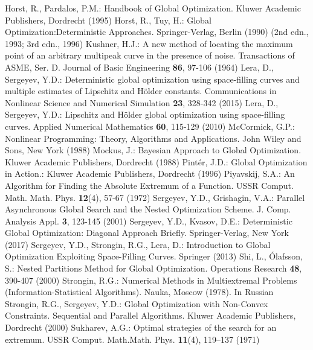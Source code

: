 \begin{thebibliography}{99.}
	Horst, R., Pardalos, P.M.: Handbook of Global Optimization. Kluwer Academic Publishers, Dordrecht (1995)
	Horst, R., Tuy, H.: Global Optimization:Deterministic Approaches. Springer-Verlag, Berlin (1990) (2nd edn., 1993; 3rd edn., 1996)
	Kushner, H.J.: A new method of locating the maximum point of an arbitrary multipeak curve in the presence of noise. Transactions of ASME, Ser. D. Journal of Basic Engineering \textbf{86}, 97-106 (1964)
	Lera, D., Sergeyev, Y.D.: Deterministic global optimization using space-filling curves and multiple estimates of Lipschitz and H{\"o}lder constants. Communications in Nonlinear Science and Numerical Simulation \textbf{23}, 328-342 (2015)
	Lera, D., Sergeyev, Y.D.: Lipschitz and H{\"o}lder global optimization using space-filling curves. Applied Numerical Mathematics \textbf{60}, 115-129 (2010) 
	McCormick, G.P.: Nonlinear Programming: Theory, Algorithms and Applications. John Wiley and Sons, New York (1988)
	Mockus, J.: Bayesian Approach to Global Optimization. Kluwer Academic Publishers, Dordrecht (1988)  
	Pint{\'e}r, J.D.: Global Optimization in Action.: Kluwer Academic Publishers, Dordrecht (1996) 
	Piyavskij, S.A.: An Algorithm for Finding the Absolute Extremum of a Function. USSR Comput. Math. Math. Phys. \textbf{12}(4), 57-67 (1972)
	Sergeyev, Y.D., Grishagin, V.A.: Parallel Asynchronous Global Search and the Nested Optimization Scheme. J. Comp. Analysis Appl. \textbf{3}, 123-145 (2001)
	Sergeyev, Y.D., Kvasov, D.E.: Deterministic Global Optimization: Diagonal Approach Briefly. Springer-Verlag, New York (2017)
	Sergeyev, Y.D., Strongin, R.G., Lera, D.: Introduction to Global Optimization Exploiting Space-Filling Curves. Springer (2013)
   Shi, L., {\'O}lafsson, S.: Nested Partitions Method for Global Optimization. Operations Research \textbf{48}, 390-407 (2000)
	Strongin, R.G.: Numerical Methods in Multiextremal Problems (Information-Statistical Algorithms). Nauka, Moscow (1978). In Russian
 Strongin, R.G., Sergeyev, Y.D.: Global Optimization with Non-Convex Constraints. Sequential and Parallel Algorithms. Kluwer Academic Publishers, Dordrecht (2000) 
	Sukharev, A.G.: Optimal strategies of the search for an extremum. USSR Comput. Math.Math. Phys. \textbf{11}(4), 119–137 (1971)

\end{thebibliography}
